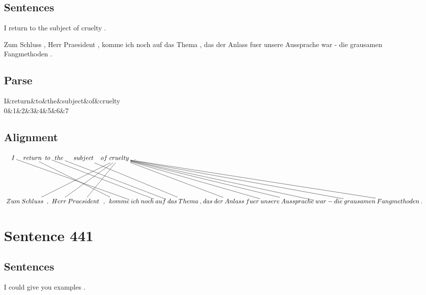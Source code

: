 \documentclass{report}
\begin{document}
\subsection*{Sentences}
I return to the subject of cruelty .

\noindent Zum Schluss , Herr Praesident , komme ich noch auf das Thema , das der Anlass fuer unsere Aussprache war - die grausamen Fangmethoden .



\subsection*{Parse}
\begin{dependency}[theme=simple]
\begin{deptext}[column sep=.5cm, row sep=.1ex]
I\&return\&to\&the\&subject\&of\&cruelty\\
0\&1\&2\&3\&4\&5\&6\&7\\
\end{deptext}
\end{dependency}


\subsection*{Alignment}
\scriptsize{
$
\xymatrix@C-2.3pc{
I \ar @{-} [ddrrrrrrr] & return \ar @{-} [ddrrrrr] & to \ar @{-} [ddrrrrrrr] & the \ar @{-} [ddrrrrrrr] & subject \ar @{-} [ddrrrrrrr] & of & cruelty \ar @{-} [ddrrrrrrrrrrrrr] \ar @{-} [ddll] \ar @{-} [ddrrrrrrrrrrrr] \ar @{-} [ddlllll] \ar @{-} [ddlll] \ar @{-} [ddrrrrrrrrrrrrrrrrr] \ar @{-} [ddrrrrrrrrrrrrrrrr] \ar @{-} [ddrrrrrrrrrrr] \ar @{-} [ddrrrrrrrrr] & .\\\\
Zum & Schluss & , & Herr & Praesident & , & komme & ich & noch & auf & das & Thema & , & das & der & Anlass & fuer & unsere & Aussprache & war & - & die & grausamen & Fangmethoden & .
}$}
\newpage\section*{Sentence 441}

\subsection*{Sentences}
I could give you examples .
\end{document}

